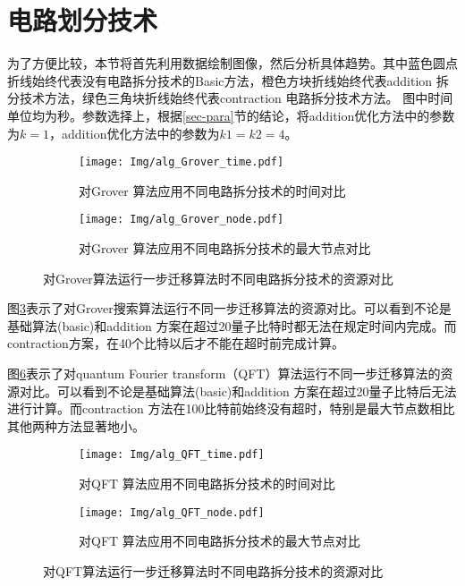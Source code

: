 \section{电路划分技术}
为了方便比较，本节将首先利用数据绘制图像，然后分析具体趋势。其中蓝色圆点折线始终代表没有电路拆分技术的Basic方法，橙色方块折线始终代表addition 拆分技术方法，绿色三角块折线始终代表contraction 电路拆分技术方法。
图中时间单位均为秒。参数选择上，根据\ref{sec-para}节的结论，将addition优化方法中的参数为$k=1$，addition优化方法中的参数为$k1=k2=4$。
\begin{figure}[htbp]
    \centering
    \begin{subfigure}[b]{.45\textwidth}
        \centering
        \texttt{[image: Img/alg\_Grover\_time.pdf]}
        \caption{对Grover 算法应用不同电路拆分技术的时间对比}
        \label{fig:grover-time}
    \end{subfigure}
    \qquad
    \begin{subfigure}[b]{.45\textwidth}
        \centering
        \texttt{[image: Img/alg\_Grover\_node.pdf]}
        \caption{对Grover 算法应用不同电路拆分技术的最大节点对比}
        \label{fig:grover-node}
    \end{subfigure}
    
    \caption{对Grover算法运行一步迁移算法时不同电路拆分技术的资源对比}
    \label{fig:grover-compare}
\end{figure}



图\ref{fig:grover-compare}表示了对Grover搜索算法运行不同一步迁移算法的资源对比。可以看到不论是基础算法(basic)和addition 方案在超过20量子比特时都无法在规定时间内完成。而contraction方案，在40个比特以后才不能在超时前完成计算。


图\ref{fig:QFT-compare}表示了对quantum Fourier transform（QFT）算法运行不同一步迁移算法的资源对比。可以看到不论是基础算法(basic)和addition 方案在超过20量子比特后无法进行计算。而contraction 方法在100比特前始终没有超时，特别是最大节点数相比其他两种方法显著地小。
\begin{figure}[!htbp]
    \centering
    \begin{subfigure}[b]{.45\textwidth}
        \centering
        \texttt{[image: Img/alg\_QFT\_time.pdf]}
        \caption{对QFT 算法应用不同电路拆分技术的时间对比}
        \label{fig:QFT-time}
    \end{subfigure}
    \qquad
    \begin{subfigure}[b]{.45\textwidth}
        \centering
        \texttt{[image: Img/alg\_QFT\_node.pdf]}
        \caption{对QFT 算法应用不同电路拆分技术的最大节点对比}
        \label{fig:QFT-node}
    \end{subfigure}
    \caption{对QFT算法运行一步迁移算法时不同电路拆分技术的资源对比}
    \label{fig:QFT-compare}
\end{figure}

